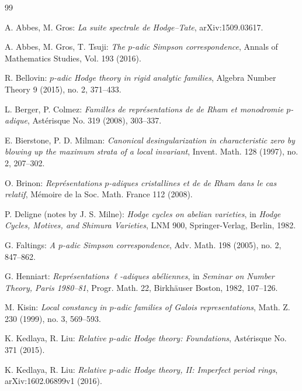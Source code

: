 
\begin{thebibliography}{99}

A. Abbes, M. Gros: \textit{La suite spectrale de Hodge--Tate}, arXiv:1509.03617.

A. Abbes, M. Gros, T. Tsuji: \textit{The $p$-adic Simpson correspondence},
Annals of Mathematics Studies, Vol. 193 (2016).

R. Bellovin: \textit{$p$-adic Hodge theory in rigid analytic families},
Algebra Number Theory 9 (2015), no. 2, 371--433.

L. Berger, P. Colmez: \textit{Familles de repr\'esentations de de Rham et monodromie $p$-adique},
Ast\'erisque No. 319 (2008), 303--337.

E. Bierstone, P. D. Milman: \textit{Canonical desingularization in characteristic zero
by blowing up the maximum strata of a local invariant}, Invent. Math. 128 (1997), no. 2, 207--302.

O. Brinon: \textit{Repr\'esentations $p$-adiques cristallines et de de Rham dans le cas relatif},
M\'emoire de la Soc. Math. France 112 (2008).

P. Deligne (notes by J. S. Milne): \textit{Hodge cycles on abelian varieties},
in \textit{Hodge Cycles, Motives, and Shimura Varieties}, LNM 900, Springer-Verlag, Berlin, 1982.

G. Faltings: \textit{A $p$-adic Simpson correspondence}, Adv. Math. 198 (2005), no. 2, 847--862.

G. Henniart: \textit{Repr\'esentations $\ell$-adiques ab\'eliennes},
in \textit{Seminar on Number Theory, Paris 1980--81}, Progr. Math. 22,
Birkh\"auser Boston, 1982, 107--126.

M. Kisin: \textit{Local constancy in $p$-adic families of Galois representations},
Math. Z. 230 (1999), no. 3, 569--593.

K. Kedlaya, R. Liu: \textit{Relative $p$-adic Hodge theory: Foundations},
Ast\'erisque No. 371 (2015).

K. Kedlaya, R. Liu: \textit{Relative $p$-adic Hodge theory, II: Imperfect period rings},
arXiv:1602.06899v1 (2016).


\end{thebibliography}
